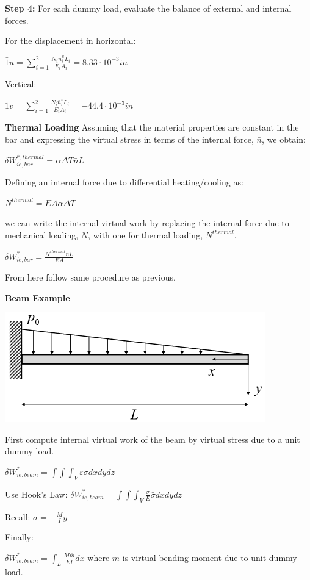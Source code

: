 \documentclass{article}
\begin{document}
\begin{multicols*}{2}
   \textbf{Step 4:} For each dummy load, evaluate the balance of external and 
   internal forces. \par 
   For the displacement in horizontal:\par 
   $\bar{1}u = \sum\limits_{i=1}^2 \frac{N_i\bar{n}_i^uL_i}{E_iA_i} = 8.33 \cdot 10^{-3} in$ \par 
   Vertical: \par 
   $\bar{1}v = \sum\limits_{i=1}^2 \frac{N_i\bar{n}_i^vL_i}{E_iA_i} = -44.4 \cdot 10^{-3} in$ \par

    \textbf{Thermal Loading}
    Assuming that the material properties are constant in the bar and expressing
    the virtual stress in terms of the internal force, $\bar{n}$, we obtain:\par
    $\delta W_{ie,bar}^{*,thermal}=\alpha \Delta T \bar{n} L$\par 
    Defining an internal force due to differential heating/cooling as:\par
    $N^{thermal} = EA\alpha \Delta T$\par 
    we can write the internal virtual work by replacing the internal force due to
    mechanical loading, $N$, with one for thermal loading, $N^{thermal}$.\par 
    $\delta W_{ie,bar}^* = \frac{N^{thermal}\bar{n}L}{EA}$\par 
    From here follow same procedure as previous.

    \textbf{Beam Example}\par 
    \includegraphics[width=0.5\linewidth]{Figures/Beam_Eample_VF.png}\par 
    First compute internal virtual work of the beam by virtual stress due to a unit dummy load.\par 
    $\delta W_{ie,beam}^*=\int \int \int_V \varepsilon\bar{\sigma}dxdydz$\par 
    Use Hook's Law: $\delta W_{ie,beam}^*=\int \int \int_V \frac{\sigma}{E}\bar{\sigma}dxdydz$\par 
    Recall: $\sigma = -\frac{M}{I}y$\par 
    Finally:\par 
    $\delta W_{ie,beam}^* = \int_L \frac{M\bar{m}}{EI}dx$ where $\bar{m}$ is
    virtual bending moment due to unit dummy load.


\end{multicols*}
\end{document}
